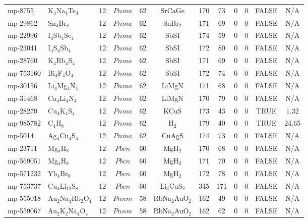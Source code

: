 {\begin{longtable}{llcccccccccc}
    mp-8755 & K$_{4}$Na$_{4}$Te$_{4}$ & 12    & $Pnma$ & 62    & SrCaGe & 170   & 73    & 0     & 0     & FALSE & N/A \\
    mp-29862 & Sn$_{4}$Br$_{8}$ & 12    & $Pnma$ & 62    & SnBr$_{2}$ & 171   & 69    & 0     & 0     & FALSE & N/A \\
    mp-22996 & I$_{4}$Sb$_{4}$Se$_{4}$ & 12    & $Pnma$ & 62    & SbSI  & 174   & 59    & 0     & 0     & FALSE & N/A \\
    mp-23041 & I$_{4}$S$_{4}$Sb$_{4}$ & 12    & $Pnma$ & 62    & SbSI  & 172   & 80    & 0     & 0     & FALSE & N/A \\
    mp-28760 & K$_{4}$Rb$_{4}$S$_{4}$ & 12    & $Pnma$ & 62    & SbSI  & 171   & 69    & 0     & 0     & FALSE & N/A \\
    mp-753160 & Bi$_{4}$F$_{4}$O$_{4}$ & 12    & $Pnma$ & 62    & SbSI  & 172   & 74    & 0     & 0     & FALSE & N/A \\
    mp-30156 & Li$_{4}$Mg$_{4}$N$_{4}$ & 12    & $Pnma$ & 62    & LiMgN & 171   & 68    & 0     & 0     & FALSE & N/A \\
    mp-31468 & Ca$_{4}$Li$_{4}$N$_{4}$ & 12    & $Pnma$ & 62    & LiMgN & 170   & 79    & 0     & 0     & FALSE & N/A \\
    mp-28270 & Cu$_{4}$K$_{4}$S$_{4}$ & 12    & $Pnma$ & 62    & KCuS  & 173   & 43    & 0     & 0     & TRUE  & 1.32  \\
    mp-985782 & C$_{4}$H$_{8}$ & 12    & $Pnma$ & 62    & H$_{2}$ & 179   & 40    & 0     & 0     & TRUE  & 24.65  \\
    mp-5014 & Ag$_{4}$Cu$_{4}$S$_{4}$ & 12    & $Pnma$ & 62    & CuAgS & 174   & 73    & 0     & 0     & FALSE & N/A \\
    mp-23711 & Mg$_{4}$H$_{8}$ & 12    & $Pbcn$ & 60    & MgH$_{2}$ & 170   & 68    & 0     & 0     & FALSE & N/A \\
    mp-569051 & Mg$_{4}$H$_{8}$ & 12    & $Pbcn$ & 60    & MgH$_{2}$ & 171   & 70    & 0     & 0     & FALSE & N/A \\
    mp-571232 & Yb$_{4}$Br$_{8}$ & 12    & $Pbcn$ & 60    & MgH$_{2}$ & 172   & 78    & 0     & 0     & FALSE & N/A \\
    mp-753737 & Cu$_{4}$Li$_{12}$S$_{8}$ & 12    & $Pbcn$ & 60    & Li$_{3}$CuS$_{2}$ & 345   & 171   & 0     & 0     & FALSE & N/A \\
    mp-555018 & Au$_{2}$Na$_{4}$Rb$_{2}$O$_{4}$ & 12    & $Pnnm$ & 58    & RbNa$_{2}$AuO$_{2}$ & 162   & 49    & 0     & 0     & FALSE & N/A \\
    mp-559067 & Au$_{2}$K$_{2}$Na$_{4}$O$_{4}$ & 12    & $Pnnm$ & 58    & RbNa$_{2}$AuO$_{2}$ & 162   & 62    & 0     & 0     & FALSE & N/A \\

\end{longtable}}
